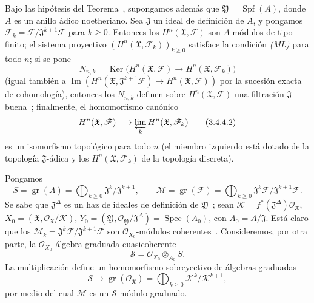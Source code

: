 \begin{corollary}[3.4.4]
\label{III.3.4.4}
\label{III.3.4.4-fr}
Bajo las hipótesis del Teorema~, supongamos además que $\mathfrak Y=\operatorname{Spf}(A)$, donde $A$ es un anillo ádico noetheriano.
Sea $\mathfrak J$ un ideal de definición de $A$, y pongamos $\mathcal F_k=\mathcal F/\mathfrak J^{k+1}\mathcal F$ para $k\geq0$.
Entonces los $H^n(\mathfrak X,\mathcal F)$ son $A$-módulos de tipo finito; el sistema proyectivo $(H^n(\mathfrak X,\mathcal F_k))_{k\geq0}$ satisface la condición \emph{(ML)} para todo $n$; si se pone
\[
N_{n,k}=\operatorname{Ker}\bigl(H^n(\mathfrak X,\mathcal F)
\longrightarrow H^n(\mathfrak X,\mathcal F_k)\bigr)
\tag{3.4.4.1}\label{III.3.4.4.1-fr}
\]
(igual también a $\operatorname{Im}(H^n(\mathfrak X,\mathfrak J^{k+1}\mathcal F)
\to H^n(\mathfrak X,\mathcal F))$ por la sucesión exacta de cohomología), entonces los $N_{n,k}$ definen sobre $H^n(\mathfrak X,\mathcal F)$ una filtración $\mathfrak J$-buena~; finalmente, el homomorfismo canónico
\[
H^n(\mathfrak X,\mathcal F)
\longrightarrow\varprojlim_kH^n(\mathfrak X,\mathcal F_k)
\tag{3.4.4.2}\label{III.3.4.4.2-fr}
\]
es un isomorfismo topológico para todo $n$ (el miembro izquierdo está dotado de la topología $\mathfrak J$-ádica y los $H^n(\mathfrak X,\mathcal F_k)$ de la topología discreta).
\end{corollary}

Pongamos
\[
S=\operatorname{gr}(A)=\bigoplus_{k\geq0}
\mathfrak J^k/\mathfrak J^{k+1},\qquad
\mathcal M=\operatorname{gr}(\mathcal F)=\bigoplus_{k\geq0}
\mathfrak J^k\mathcal F/\mathfrak J^{k+1}\mathcal F.
\tag{3.4.4.3}\label{III.3.4.4.3-fr}
\]
Se sabe que $\mathfrak J^\Delta$ es un haz de ideales de definición de $\mathfrak Y$~; sean $\mathcal K=f^*(\mathfrak J^\Delta)\mathcal O_{\mathfrak X}$, $X_0=(\mathfrak X,\mathcal O_{\mathfrak X}/\mathcal K)$, $Y_0=(\mathfrak Y,\mathcal O_{\mathfrak Y}/\mathfrak J^\Delta)
=\operatorname{Spec}(A_0)$, con $A_0=A/\mathfrak J$.
Está claro que los $\mathcal M_k=\mathfrak J^k\mathcal F/\mathfrak J^{k+1}\mathcal F$ son $\mathcal O_{X_0}$-módulos coherentes~.
Consideremos, por otra parte, la $\mathcal O_{X_0}$-álgebra graduada cuasicoherente
\[
\mathcal S=\mathcal O_{X_0}\otimes_{A_0}S.
\tag{3.4.4.4}\label{III.3.4.4.4-fr}
\]
La multiplicación define un homomorfismo sobreyectivo de álgebras graduadas
\[
\mathcal S\longrightarrow
\operatorname{gr}(\mathcal O_{\mathfrak X})
=\bigoplus_{k\geq0}\mathcal K^k/\mathcal K^{k+1},
\]
por medio del cual $\mathcal M$ es un $\mathcal S$-módulo graduado.

